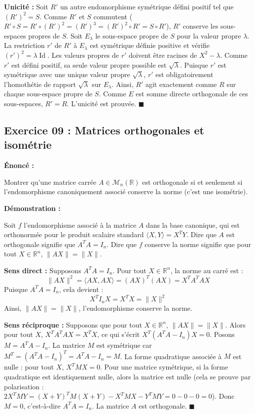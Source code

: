 \documentclass[11pt,a4paper]{article}
\begin{document}
\textbf{Unicité :}
Soit $R'$ un autre endomorphisme symétrique défini positif tel que $(R')^2 = S$.
Comme $R'$ et $S$ commutent ($R' \circ S = R' \circ (R')^2 = (R')^3 = (R')^2 \circ R' = S \circ R'$), $R'$ conserve les sous-espaces propres de $S$.
Soit $E_\lambda$ le sous-espace propre de $S$ pour la valeur propre $\lambda$.
La restriction $r'$ de $R'$ à $E_\lambda$ est symétrique définie positive et vérifie $(r')^2 = \lambda \operatorname{Id}$.
Les valeurs propres de $r'$ doivent être racines de $X^2 - \lambda$. Comme $r'$ est défini positif, sa seule valeur propre possible est $\sqrt{\lambda}$.
Puisque $r'$ est symétrique avec une unique valeur propre $\sqrt{\lambda}$, $r'$ est obligatoirement l'homothétie de rapport $\sqrt{\lambda}$ sur $E_\lambda$.
Ainsi, $R'$ agit exactement comme $R$ sur chaque sous-espace propre de $S$.
Comme $E$ est somme directe orthogonale de ces sous-espaces, $R' = R$. L'unicité est prouvée. $\blacksquare$

\subsection*{Exercice 09 : Matrices orthogonales et isométrie}


\textbf{Énoncé :}


Montrer qu'une matrice carrée $A \in \mathcal{M}_n(\mathbb{R})$ est orthogonale si et seulement si l'endomorphisme canoniquement associé conserve la norme (c'est une isométrie).

\textbf{Démonstration :}


Soit $f$ l'endomorphisme associé à la matrice $A$ dans la base canonique, qui est orthonormée pour le produit scalaire standard $\langle X, Y \rangle = X^T Y$.
Dire que $A$ est orthogonale signifie que $A^T A = I_n$.
Dire que $f$ conserve la norme signifie que pour tout $X \in \mathbb{R}^n$, $\|AX\| = \|X\|$.

\textbf{Sens direct :} Supposons $A^T A = I_n$.
Pour tout $X \in \mathbb{R}^n$, la norme au carré est :
$$ \|AX\|^2 = \langle AX, AX \rangle = (AX)^T (AX) = X^T A^T A X $$
Puisque $A^T A = I_n$, cela devient :
$$ X^T I_n X = X^T X = \|X\|^2 $$
Ainsi, $\|AX\| = \|X\|$, l'endomorphisme conserve la norme.

\textbf{Sens réciproque :} Supposons que pour tout $X \in \mathbb{R}^n$, $\|AX\| = \|X\|$.
Alors pour tout $X$, $X^T A^T A X = X^T X$, ce qui s'écrit $X^T (A^T A - I_n) X = 0$.
Posons $M = A^T A - I_n$. La matrice $M$ est symétrique car $M^T = (A^T A - I_n)^T = A^T A - I_n = M$.
La forme quadratique associée à $M$ est nulle : pour tout $X$, $X^T M X = 0$.
Pour une matrice symétrique, si la forme quadratique est identiquement nulle, alors la matrice est nulle (cela se prouve par polarisation : $2 X^T M Y = (X+Y)^T M (X+Y) - X^T M X - Y^T M Y = 0 - 0 - 0 = 0$).
Donc $M = 0$, c'est-à-dire $A^T A = I_n$. La matrice $A$ est orthogonale. $\blacksquare$
\end{document}
